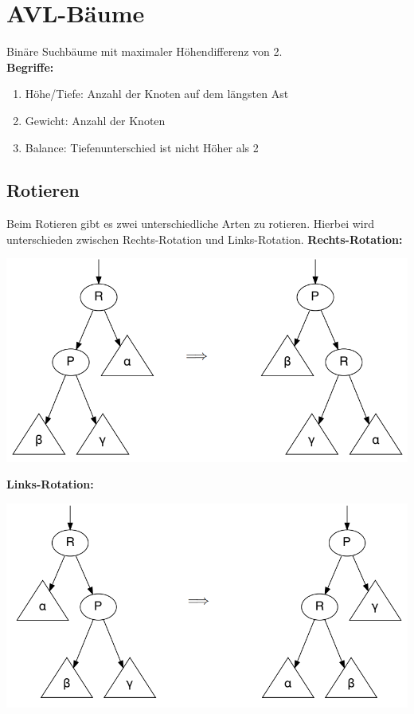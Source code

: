 \documentclass[12pt,a4paper]{article}
\begin{document}
\section{AVL-Bäume}
	Binäre Suchbäume mit maximaler Höhendifferenz von 2.\\
	\textbf{Begriffe:}\\
	\begin{enumerate}
		\item Höhe/Tiefe: Anzahl der Knoten auf dem längsten Ast
		\item Gewicht: Anzahl der Knoten
		\item Balance: Tiefenunterschied ist nicht Höher als 2
	\end{enumerate}

\subsection{Rotieren}
Beim Rotieren gibt es zwei unterschiedliche Arten zu rotieren. Hierbei wird unterschieden zwischen Rechts-Rotation und Links-Rotation.\newline
\textbf{Rechts-Rotation:}\newline
\begin{center}
	\includegraphics[scale=1]{Bilder/AVL_rechts_rot.PNG}
\end{center}
\textbf{Links-Rotation:}\newline
\begin{center}
	\includegraphics[scale=1]{Bilder/AVL_links_rot.PNG}
\end{center}
\end{document}
